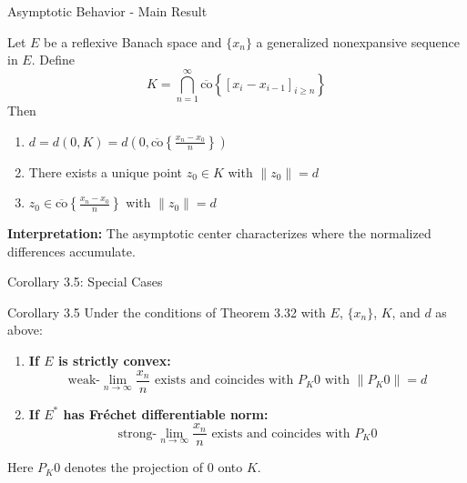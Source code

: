 \documentclass[aspectratio=169,10pt]{beamer}
\begin{document}
\begin{frame}{Asymptotic Behavior - Main Result}
    \begin{theorem}
        Let $E$ be a reflexive Banach space and $\{x_n\}$ a generalized nonexpansive sequence in $E$.
        Define
        \[
        K = \bigcap_{n=1}^{\infty} \overline{\text{co}}\left\{\left[x_i - x_{i-1}\right]_{i \geq n}\right\}
        \]
        Then
        \begin{enumerate}
            \item $d = d\left(0, K\right) = d\left(0, \overline{\text{co}}\left\{\frac{x_n - x_0}{n}\right\}\right)$

            \item There exists a unique point $z_0 \in K$ with $\|z_0\| = d$

            \item $z_0 \in \overline{\text{co}}\left\{\frac{x_n - x_0}{n}\right\}$ with $\|z_0\| = d$
        \end{enumerate}
    \end{theorem}

    \vspace{0.3cm}

    \textbf{Interpretation:} The asymptotic center characterizes where the normalized differences accumulate.
\end{frame}

\begin{frame}{Corollary 3.5: Special Cases}
    \begin{block}{Corollary 3.5}
        Under the conditions of Theorem 3.32 with $E$, $\{x_n\}$, $K$, and $d$ as above:

        \begin{enumerate}
            \item \textbf{If $E$ is strictly convex:}
                \[
                \text{weak-}\lim_{n \to \infty} \frac{x_n}{n} \text{ exists and coincides with } P_K 0 \text{ with } \|P_K 0\| = d
                \]

            \item \textbf{If $E^*$ has Fréchet differentiable norm:}
                \[
                \text{strong-}\lim_{n \to \infty} \frac{x_n}{n} \text{ exists and coincides with } P_K 0
                \]
        \end{enumerate}
    \end{block}

    \vspace{0.4cm}

    Here $P_K 0$ denotes the projection of $0$ onto $K$.
\end{frame}
\end{document}
